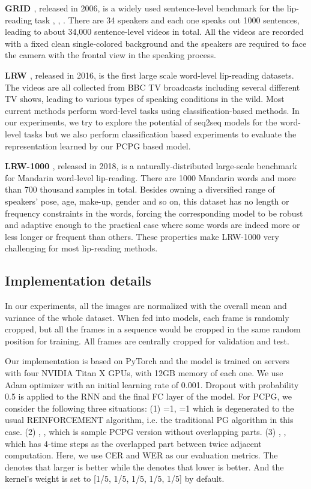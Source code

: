 \documentclass[a4paper, 10pt, conference]{ieeeconf}      \usepackage{FG2020}
\begin{document}
{\bf GRID \cite{cooke2006}}, released in 2006, is a widely used sentence-level benchmark for the lip-reading task \cite{Assael2016}, \cite{Lan2009}, \cite{Wand2016}. There are 34 speakers and each one speaks out 1000 sentences, leading to about 34,000 sentence-level videos in total. All the videos are recorded with a fixed clean single-colored background and the speakers are required to face the camera with the frontal view in the speaking process. 

{\bf LRW \cite{B2017}}, released in 2016, is the first large scale word-level lip-reading datasets. The videos are all collected from BBC TV broadcasts including several different TV shows, leading to various types of speaking conditions in the wild. Most current methods perform word-level tasks using classification-based methods. In our experiments, we try to explore the potential of seq2seq models for the word-level tasks but we also perform classification based experiments to evaluate the representation learned by our PCPG based model.

{\bf LRW-1000 \cite{Yang2019}}, released in 2018, is a naturally-distributed large-scale benchmark for Mandarin word-level lip-reading. There are 1000 Mandarin words and more than 700 thousand samples in total. Besides owning a diversified range of speakers' pose, age, make-up, gender and so on, this dataset has no length or frequency constraints in the words, forcing the corresponding model to be robust and adaptive enough to the practical case where some words are indeed more or less longer or frequent than others. These properties make LRW-1000 very challenging for most lip-reading methods. 
\vspace{0.3cm}
\subsection{Implementation details}
In our experiments, all the images are normalized with the overall mean and variance of the whole dataset. When fed into models, each frame is randomly cropped, but all the frames in a sequence would be cropped in the same random position for training. All frames are centrally cropped for validation and test.  

Our implementation is based on PyTorch and the model is trained on servers with four NVIDIA Titan X GPUs, with 12GB memory of each one. We use Adam optimizer with an initial learning rate of 0.001. Dropout with probability 0.5 is applied to the RNN and the final FC layer of the model. 
For PCPG, we consider the following three situations: (1) =1, =1 which is degenerated to the usual REINFORCEMENT algorithm, i.e. the traditional PG algorithm in this case. (2) , , which is sample PCPG version without overlapping parts. (3) , , which has 4-time steps as the overlapped part between twice adjacent computation. Here, we use CER and WER as our evaluation metrics. The  denotes that larger is better while the  denotes that lower is better. And the kernel's weight  is set to [1/5, 1/5, 1/5, 1/5, 1/5] by default.
\end{document}
